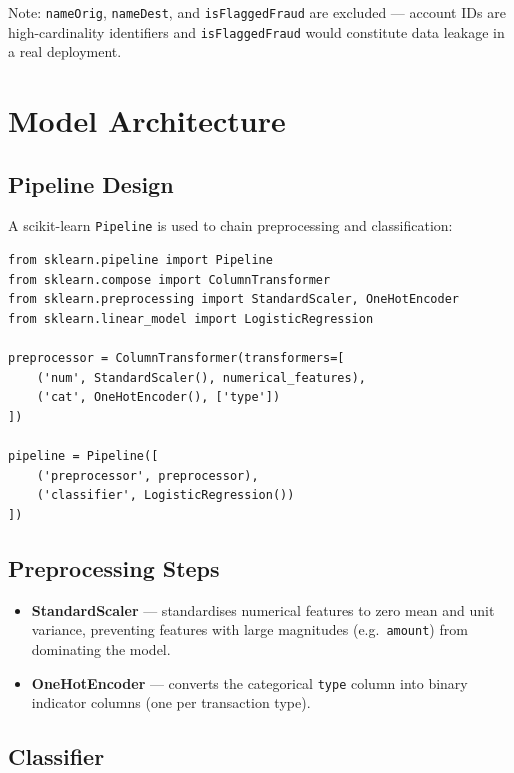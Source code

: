 \documentclass[12pt, a4paper]{article}
\begin{document}
Note: \texttt{nameOrig}, \texttt{nameDest}, and \texttt{isFlaggedFraud} are excluded — account IDs are high-cardinality identifiers and \texttt{isFlaggedFraud} would constitute data leakage in a real deployment.

\section{Model Architecture}

\subsection{Pipeline Design}

A scikit-learn \texttt{Pipeline} is used to chain preprocessing and classification:

\begin{lstlisting}
from sklearn.pipeline import Pipeline
from sklearn.compose import ColumnTransformer
from sklearn.preprocessing import StandardScaler, OneHotEncoder
from sklearn.linear_model import LogisticRegression

preprocessor = ColumnTransformer(transformers=[
    ('num', StandardScaler(), numerical_features),
    ('cat', OneHotEncoder(), ['type'])
])

pipeline = Pipeline([
    ('preprocessor', preprocessor),
    ('classifier', LogisticRegression())
])
\end{lstlisting}

\subsection{Preprocessing Steps}

\begin{itemize}
    \item \textbf{StandardScaler} — standardises numerical features to zero mean and unit variance, preventing features with large magnitudes (e.g.\ \texttt{amount}) from dominating the model.
    \item \textbf{OneHotEncoder} — converts the categorical \texttt{type} column into binary indicator columns (one per transaction type).
\end{itemize}

\subsection{Classifier}
\end{document}
